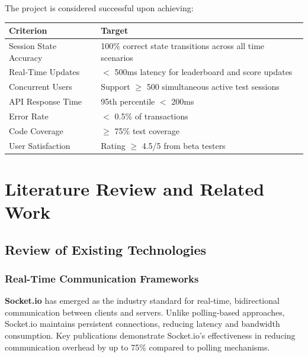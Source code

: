 \documentclass[12pt,a4paper]{report}
\newenvironment{reqbox}{%
  \begin{tcolorbox}[colback=lightgray,colframe=rulecol,
    leftrule=3pt,rightrule=0.4pt,toprule=0.4pt,bottomrule=0.4pt,
    arc=2pt,boxsep=2pt,left=4pt,right=4pt,top=3pt,bottom=3pt,breakable]
}{\end{tcolorbox}}
\begin{document}
The project is considered successful upon achieving:

\begin{reqbox}
  \begin{tabular}{l|p{8cm}}
    \textbf{Criterion} & \textbf{Target} \\
    \hline
    Session State Accuracy & 100\% correct state transitions across all time scenarios \\
    \hline
    Real-Time Updates & $<$ 500ms latency for leaderboard and score updates \\
    \hline
    Concurrent Users & Support $\geq$ 500 simultaneous active test sessions \\
    \hline
    API Response Time & 95th percentile $<$ 200ms \\
    \hline
    Error Rate & $<$ 0.5\% of transactions \\
    \hline
    Code Coverage & $\geq$ 75\% test coverage \\
    \hline
    User Satisfaction & Rating $\geq$ 4.5/5 from beta testers \\
    \hline
  \end{tabular}
\end{reqbox}

\cleardoublepage


\chapter{Literature Review and Related Work}

\section{Review of Existing Technologies}

\subsection{Real-Time Communication Frameworks}

\textbf{Socket.io} has emerged as the industry standard for real-time, bidirectional communication between clients and servers. Unlike polling-based approaches, Socket.io maintains persistent connections, reducing latency and bandwidth consumption. Key publications \cite{biswas2015socket} demonstrate Socket.io's effectiveness in reducing communication overhead by up to 75\% compared to polling mechanisms.
\end{document}

